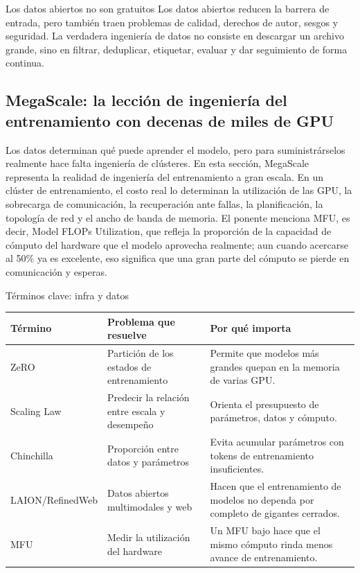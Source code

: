 \begin{warningbox}{Los datos abiertos no son gratuitos}
Los datos abiertos reducen la barrera de entrada, pero también traen problemas de calidad, derechos de autor, sesgos y seguridad. La verdadera ingeniería de datos no consiste en descargar un archivo grande, sino en filtrar, deduplicar, etiquetar, evaluar y dar seguimiento de forma continua.
\end{warningbox}

\subsection{MegaScale: la lección de ingeniería del entrenamiento con decenas de miles de GPU}

Los datos determinan qué puede aprender el modelo, pero para suministrárselos realmente hace falta ingeniería de clústeres. En esta sección, MegaScale representa la realidad de ingeniería del entrenamiento a gran escala. En un clúster de entrenamiento, el costo real lo determinan la utilización de las GPU, la sobrecarga de comunicación, la recuperación ante fallas, la planificación, la topología de red y el ancho de banda de memoria. El ponente menciona MFU, es decir, Model FLOPs Utilization, que refleja la proporción de la capacidad de cómputo del hardware que el modelo aprovecha realmente; aun cuando acercarse al 50\% ya es excelente, eso significa que una gran parte del cómputo se pierde en comunicación y esperas.

\begin{knowledgebox}{Términos clave: infra y datos}
\begin{tabularx}{\textwidth}{p{}p{}X}
\toprule
Término & Problema que resuelve & Por qué importa \\
\midrule
ZeRO & Partición de los estados de entrenamiento & Permite que modelos más grandes quepan en la memoria de varias GPU. \\
Scaling Law & Predecir la relación entre escala y desempeño & Orienta el presupuesto de parámetros, datos y cómputo. \\
Chinchilla & Proporción entre datos y parámetros & Evita acumular parámetros con tokens de entrenamiento insuficientes. \\
LAION/RefinedWeb & Datos abiertos multimodales y web & Hacen que el entrenamiento de modelos no dependa por completo de gigantes cerrados. \\
MFU & Medir la utilización del hardware & Un MFU bajo hace que el mismo cómputo rinda menos avance de entrenamiento. \\
\bottomrule
\end{tabularx}
\end{knowledgebox}

